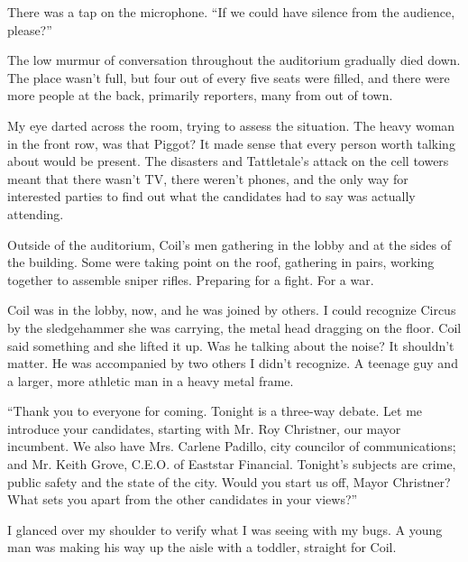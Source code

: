 





There was a tap on the microphone.  ``If we could have silence from the audience, please?''



The low murmur of conversation throughout the auditorium gradually died down.  The place wasn't full, but four out of every five seats were filled, and there were more people at the back, primarily reporters, many from out of town.



My eye darted across the room, trying to assess the situation.  The heavy woman in the front row, was that Piggot?  It made sense that every person worth talking about would be present.  The disasters and Tattletale's attack on the cell towers meant that there wasn't TV, there weren't phones, and the only way for interested parties to find out what the candidates had to say was actually attending.



Outside of the auditorium, Coil's men gathering in the lobby and at the sides of the building.  Some were taking point on the roof, gathering in pairs, working together to assemble sniper rifles.  Preparing for a fight.  For a war.



Coil was in the lobby, now, and he was joined by others.  I could recognize Circus by the sledgehammer she was carrying, the metal head dragging on the floor.  Coil said something and she lifted it up.  Was he talking about the noise?  It shouldn't matter.  He was accompanied by two others I didn't recognize.  A teenage guy and a larger, more athletic man in a heavy metal frame.



``Thank you to everyone for coming.  Tonight is a three-way debate.  Let me introduce your candidates, starting with Mr. Roy Christner, our mayor incumbent.  We also have Mrs. Carlene Padillo, city councilor of communications; and Mr. Keith Grove, C.E.O. of Eaststar Financial.  Tonight's subjects are crime, public safety and the state of the city.  Would you start us off, Mayor Christner?  What sets you apart from the other candidates in your views?''



I glanced over my shoulder to verify what I was seeing with my bugs.  A young man was making his way up the aisle with a toddler, straight for Coil.




